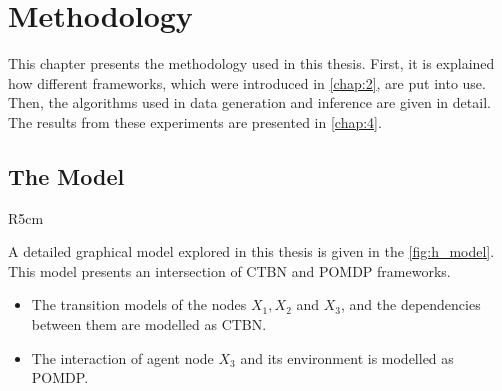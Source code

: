%
\chapter{Methodology}
\label{chap:3}

This chapter presents the methodology used in this thesis. First, it is explained how different frameworks, which were introduced in \cref{chap:2}, are put into use. Then, the algorithms used in data generation and inference are given in detail. The results from these experiments are presented in \cref{chap:4}.

\section{The Model}
\begin{wrapfigure}{R}{5cm}
	\centering
	\caption{Hierarchical model.}
	\label{fig:h_model}
	\vspace{-80pt}
\end{wrapfigure}
A detailed graphical model explored in this thesis is given in the \cref{fig:h_model}. This model presents an intersection of CTBN and POMDP frameworks. 
\begin{itemize}
	\item The transition models of the nodes $ X_1, X_2$ and $ X_3 $, and the dependencies between them are modelled as CTBN.
	\item The interaction of agent node $ X_3 $ and its environment is modelled as POMDP.
\end{itemize}

